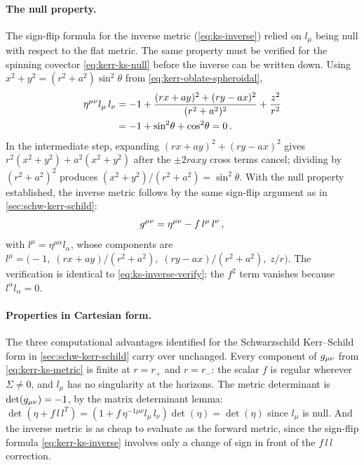 \paragraph{The null property.}

The sign-flip formula for the inverse metric
(\cref{eq:ks-inverse}) relied on $l_\mu$ being null with respect
to the flat metric.  The same property must be verified for the
spinning covector \eqref{eq:kerr-ks-null} before the inverse can
be written down.  Using $x^2 + y^2 = (r^2 + a^2)\sin^2\!\theta$
from \cref{eq:kerr-oblate-spheroidal},
%
\begin{align}
  \eta^{\mu\nu}l_\mu\,l_\nu
  &= -1 + \frac{(rx+ay)^2 + (ry-ax)^2}{(r^2+a^2)^2}
    + \frac{z^2}{r^2} \notag \\
  &= -1 + \sin^2\!\theta + \cos^2\!\theta = 0 \,.
  \label{eq:kerr-ks-null-verify}
\end{align}
%
In the intermediate step, expanding $(rx+ay)^2 + (ry-ax)^2$ gives
$r^2(x^2+y^2) + a^2(x^2+y^2)$ after the $\pm 2raxy$ cross terms
cancel; dividing by $(r^2+a^2)^2$ produces
$(x^2+y^2)/(r^2+a^2) = \sin^2\!\theta$.  With the null property
established, the inverse metric follows by the same sign-flip
argument as in \cref{sec:schw-kerr-schild}:
%
\begin{equation}
  g^{\mu\nu} = \eta^{\mu\nu} - f\,l^\mu\,l^\nu \,,
  \label{eq:kerr-ks-inverse}
\end{equation}
%
with $l^\mu = \eta^{\mu\alpha}l_\alpha$, whose components are
$l^\mu = \bigl(-1,\; (rx+ay)/(r^2+a^2),\;
(ry-ax)/(r^2+a^2),\; z/r\bigr)$.  The verification is identical to
\cref{eq:ks-inverse-verify}: the $f^2$ term vanishes because
$l^\alpha l_\alpha = 0$.

\paragraph{Properties in Cartesian form.}

The three computational advantages identified for the Schwarzschild
Kerr--Schild form in \cref{sec:schw-kerr-schild} carry over
unchanged.  Every component of $g_{\mu\nu}$ from
\cref{eq:kerr-ks-metric} is finite at $r = r_+$ and $r = r_-$: the
scalar $f$ is regular wherever $\Sigma \neq 0$, and $l_\mu$ has no
singularity at the horizons.  The metric determinant is
$\det(g_{\mu\nu}) = -1$, by the matrix determinant lemma:
$\det(\eta + f\,l\,l^T) = (1 + f\,\eta^{-1\mu\nu}l_\mu\,l_\nu)
\det(\eta) = \det(\eta)$ since $l_\mu$ is null.  And the inverse
metric is as cheap to evaluate as the forward metric, since the
sign-flip formula \eqref{eq:kerr-ks-inverse} involves only a change
of sign in front of the $f\,l\,l$ correction.

